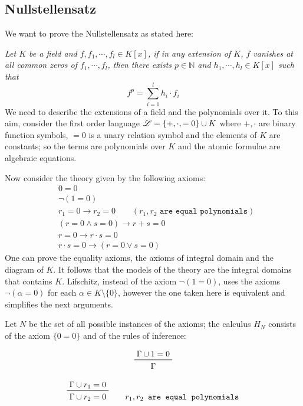 \documentclass[a4paper,12pt,oneside]{book}
\let\o\vee
\let\e\wedge
\begin{document}
\subsection*{Nullstellensatz}


We want to prove the Nullstellensatz as stated here:

\noindent\textit{Let $K$ be a field and $f,f_1,\cdots, f_l \in K[{x}]$, if in any extension of $K$, $f$ vanishes at all common zeros of $f_1,\cdots, f_l$, then there exists $p\in \mathbb{N}$ and $h_1,\cdots, h_l \in K[{x}]$ such that} 
$$
f^p = \sum_{i=1}^l h_i \cdot f_i
$$
We need to describe the extensions of a field and the polynomials over it. To this aim, consider the first order language $\mathscr{L}=\{+,\cdot,=\nobreak 0\}\cup\nobreak K$ where $+,\cdot$ are binary function symbols, $=0$ is a unary relation symbol and the elements of $K$ are constants; so the terms are polynomials over $K$ and the atomic formulae are algebraic equations.

\noindent Now consider the theory given by the following axioms:
\begin{eqnarray}
& 0=0  \label{ax00} \\
& \neg (1 =0) \\
& r_1=0 \rightarrow r_2 =0 \qquad (r_1,r_2 \texttt{ are equal polynomials}) \\
& ( r=0 \e s=0) \rightarrow r+s=0 \\
& r=0 \rightarrow r\cdot s=0 \\
& r\cdot s=0 \rightarrow (r=0 \o s=0) \label{axintdom}
\end{eqnarray}
One can prove the equality axioms, the axioms of integral domain and the diagram of $K$. It follows that the models of the theory are the integral domains that contains $K$. Lifschitz, instead of the axiom $\neg (1=0)$, uses the axioms  $\neg (\alpha =0)$ for each $\alpha\in K\setminus \{0\}$, however the one taken here is equivalent and simplifies the next arguments.  

Let $N$ be the set of all possible instances of the axioms; the calculus $H_N$ consists of the axiom $\{0=0\}$ and of the rules of inference:

\begin{equation}\label{non1=0}
\prftree{\Gamma \cup 1=0}{\Gamma}
\end{equation}

\begin{equation}\label{eqpoly}
\prftree{\Gamma \cup r_1=0 } { \Gamma \cup r_2=0 } \qquad r_1,r_2\texttt{ are equal polynomials}
\end{equation}
\end{document}
